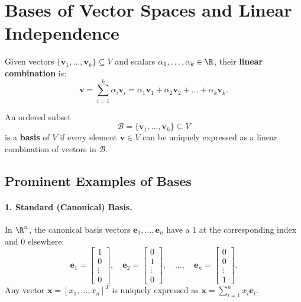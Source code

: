\FloatBarrier
\section{Bases of Vector Spaces and Linear Independence}

\begin{definition}
Given vectors $\{\mathbf{v}_1, \dots, \mathbf{v}_k\} \subseteq V$ and scalars $\alpha_1, \dots, \alpha_k \in \R$, their \textbf{linear combination} is:
\begin{equation}
    \mathbf{v} = \sum_{i=1}^k \alpha_i \mathbf{v}_i = \alpha_1 \mathbf{v}_1 + \alpha_2 \mathbf{v}_2 + \dots + \alpha_k \mathbf{v}_k.
\end{equation}
\end{definition}

\begin{definition}
An ordered subset
\begin{equation}
    \mathcal{B} = \{\mathbf{v}_1, \dots, \mathbf{v}_k\} \subseteq V
\end{equation}
is a \textbf{basis} of $V$ if every element $\mathbf{v} \in V$ can be uniquely expressed as a linear combination of vectors in $\mathcal{B}$.
\end{definition}

\subsection{Prominent Examples of Bases}

\paragraph{1. Standard (Canonical) Basis.}
In $\R^n$, the canonical basis vectors $\mathbf{e}_1, \dots, \mathbf{e}_n$ have a $1$ at the corresponding index and $0$ elsewhere:
\begin{equation}
    \mathbf{e}_1 = \begin{bmatrix} 1 \\ 0 \\ \vdots \\ 0 \end{bmatrix}, \quad \mathbf{e}_2 = \begin{bmatrix} 0 \\ 1 \\ \vdots \\ 0 \end{bmatrix}, \quad \dots, \quad \mathbf{e}_n = \begin{bmatrix} 0 \\ 0 \\ \vdots \\ 1 \end{bmatrix}.
\end{equation}
Any vector $\mathbf{x} = [x_1, \dots, x_n]^T$ is uniquely expressed as $\mathbf{x} = \sum_{i=1}^n x_i \mathbf{e}_i$.

